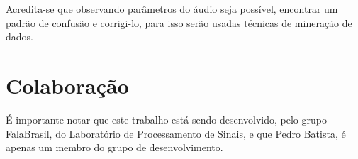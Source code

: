 \documentclass[a4paper]{article}
\begin{document}
Acredita-se que observando parâmetros do áudio seja possível, encontrar um padrão de confusão e 
corrigi-lo, para isso serão usadas técnicas de mineração de dados.

\section{Colaboração}

É importante notar que este trabalho está sendo desenvolvido, pelo grupo FalaBrasil, do
Laboratório de Processamento de Sinais, e que Pedro Batista, é apenas um membro do grupo de
desenvolvimento.


 
\end{document}
